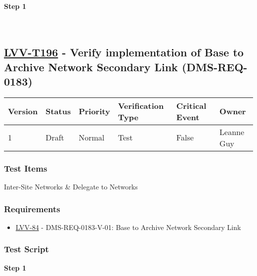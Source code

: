 \textbf{Step 1}\\
~\\
~\\

\hypertarget{lvv-t196---verify-implementation-of-base-to-archive-network-secondary-link-dms-req-0183}{%
\subsection{\texorpdfstring{\href{https://jira.lsstcorp.org/secure/Tests.jspa\#/testCase/LVV-T196}{LVV-T196}
- Verify implementation of Base to Archive Network Secondary Link
(DMS-REQ-0183)}{LVV-T196 - Verify implementation of Base to Archive Network Secondary Link (DMS-REQ-0183)}}\label{lvv-t196---verify-implementation-of-base-to-archive-network-secondary-link-dms-req-0183}}

\begin{longtable}[]{@{}llllll@{}}
\toprule
Version & Status & Priority & Verification Type & Critical Event &
Owner\tabularnewline
\midrule
\endhead
1 & Draft & Normal & Test & False & Leanne Guy\tabularnewline
\bottomrule
\end{longtable}

\hypertarget{test-items-96}{%
\subsubsection{Test Items}\label{test-items-96}}

Inter-Site Networks \& Delegate to Networks

\hypertarget{requirements-96}{%
\subsubsection{Requirements}\label{requirements-96}}

\begin{itemize}
\tightlist
\item
  \href{https://jira.lsstcorp.org/browse/LVV-84}{LVV-84} -
  DMS-REQ-0183-V-01: Base to Archive Network Secondary Link
\end{itemize}

\hypertarget{test-script-96}{%
\subsubsection{Test Script}\label{test-script-96}}

\textbf{Step 1}\\
~\\
~\\

